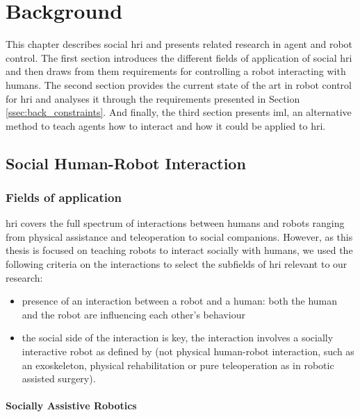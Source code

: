 \chapter{Background} \label{chap:background}

This chapter describes social \gls{hri} and presents related research in agent and robot control. The first section introduces the different fields of application of social \gls{hri} and then draws from them requirements for controlling a robot interacting with humans. The second section provides the current state of the art in robot control for \gls{hri} and analyses it through the requirements presented in Section \ref{ssec:back_constraints}. And finally, the third section presents \acrlong{iml}, an alternative method to teach agents how to interact and how it could be applied to \gls{hri}.

\section{Social Human-Robot Interaction}

\subsection{Fields of application}

\acrlong{hri} covers the full spectrum of interactions between humans and robots ranging from physical assistance and teleoperation to social companions. However, as this thesis is focused on teaching robots to interact socially with humans, we used the following criteria on the interactions to select the subfields of \gls{hri} relevant to our research:
\begin{itemize}
\item presence of an interaction between a robot and a human: both the human and the robot are influencing each other's behaviour
\item the social side of the interaction is key, the interaction involves a socially interactive robot as defined by \citet{Fong2003} (not physical human-robot interaction, such as an exoskeleton, physical rehabilitation or pure teleoperation as in robotic assisted surgery).
\end{itemize}

\subsubsection{Socially Assistive Robotics}

